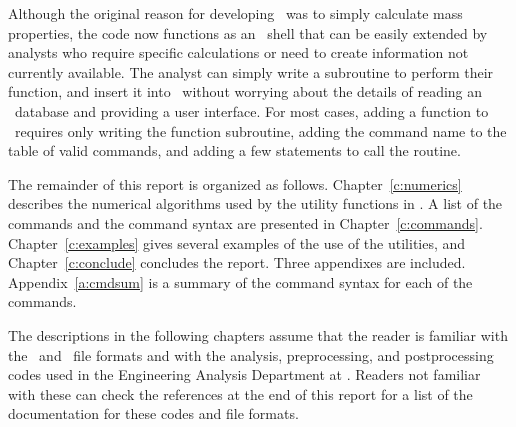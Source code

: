 Although the original reason for developing \numbers\ was to simply
calculate mass properties, the code now functions as an \exo\ shell that
can be easily extended by analysts who require specific calculations or
need to create information not currently available.  The analyst can
simply write a subroutine to perform their function, and insert it into
\numbers\ without worrying about the details of reading an \exo\
database and providing a user interface. For most cases, adding a
function to \numbers\ requires only writing the function subroutine,
adding the command name to the table of valid commands, and adding a few
statements to call the routine. 

The remainder of this report is organized as follows.
Chapter~\ref{c:numerics} describes the numerical algorithms used by the
utility functions in \numbers.  A list of the commands and the command
syntax are presented in Chapter~\ref{c:commands}.
Chapter~\ref{c:examples} gives several examples of the use of the
utilities, and Chapter~\ref{c:conclude} concludes the report.  Three
appendixes are included.  Appendix~\ref{a:cmdsum} is a summary of the
command syntax for each of the commands.

The descriptions in the following chapters assume that the reader is
familiar with the \gen\ and \exo\ file formats and with the analysis,
preprocessing, and postprocessing codes used in the Engineering Analysis
Department at \SNLA.  Readers not familiar with these can check the
references at the end of this report for a list of the documentation for
these codes and file formats.
